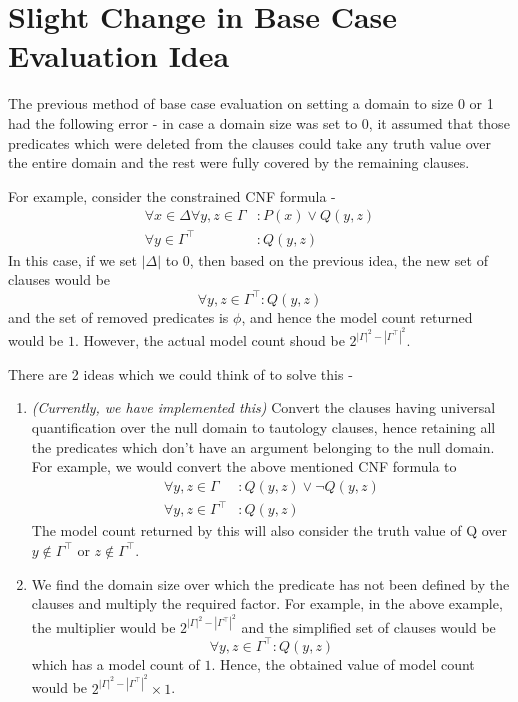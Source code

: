 \documentclass[12pt]{report}
\begin{document}
    \section*{Slight Change in Base Case Evaluation Idea}
    The previous method of base case evaluation on setting a domain to size 0 or 1 had the following error - in case a domain size was set to 0, it assumed that those predicates which were deleted from the clauses could take any truth value over the entire domain and the rest were fully covered by the remaining clauses. 
    
    For example, consider the constrained CNF formula - 
    \begin{align}
        \forall x \in \Delta \forall y, z \in \Gamma &: P(x) \lor Q(y, z) \\
        \forall y \in \Gamma^\top &: Q(y, z)
    \end{align}
    In this case, if we set $|\Delta|$ to $0$, then based on the previous idea, the new set of clauses would be 
    \begin{equation}
        \forall y, z \in \Gamma^\top : Q(y, z)
    \end{equation}
    and the set of removed predicates is $\phi$, and hence the model count returned would be $1$. However, the actual model count shoud be $2^{|\Gamma|^2 - |\Gamma^\top|^2}$.

    There are 2 ideas which we could think of to solve this - 
    \begin{enumerate}
        \item \textit{(Currently, we have implemented this)} Convert the clauses having universal quantification over the null domain to tautology clauses, hence retaining all the predicates which don't have an argument belonging to the null domain. For example, we would convert the above mentioned CNF formula to 
        \begin{align}
            \forall y, z \in \Gamma &: Q(y, z) \lor \neg Q(y, z) \\
            \forall y, z \in \Gamma^\top &: Q(y, z)
        \end{align}
        The model count returned by this will also consider the truth value of Q over $y \not \in \Gamma^\top$ or $z \not \in \Gamma^\top$.   
        \item We find the domain size over which the predicate has not been defined by the clauses and multiply the required factor. For example, in the above example, the multiplier would be $2^{|\Gamma|^2 - |\Gamma^\top|^2}$ and the simplified set of clauses would be 
        \begin{equation}
            \forall y, z \in \Gamma^\top : Q(y, z)
        \end{equation}
        which has a model count of $1$. Hence, the obtained value of model count would be $2^{|\Gamma|^2 - |\Gamma^\top|^2} \times 1$.
    \end{enumerate} 
\end{document}
